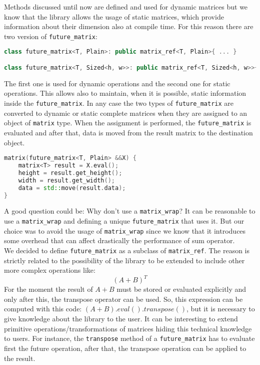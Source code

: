 \documentclass[11pt,a4paper]{article}
\begin{document}
Methods discussed until now are defined and used for dynamic matrices but we know that the library allows the usage of static matrices, which provide information about their dimension also at compile time. For this reason there are two version of \verb|future_matrix|:
\begin{lstlisting}[language=C++]
class future_matrix<T, Plain>: public matrix_ref<T, Plain>{ ... }

class future_matrix<T, Sized<h, w>>: public matrix_ref<T, Sized<h, w>>{ ... }
\end{lstlisting}
The first one is used for dynamic operations and the second one for static operations. This allows also to maintain, when it is possible, static information inside the \verb|future_matrix|. In any case the two types of \verb|future_matrix| are converted to dynamic or static complete matrices when they are assigned to an object of \verb|matrix| type. When the assignment is performed, the \verb|future_matrix| is evaluated and after that, data is moved from the result matrix to the destination object.
\begin{lstlisting}[language=C++]
matrix(future_matrix<T, Plain> &&X) {
	matrix<T> result = X.eval();
	height = result.get_height();
	width = result.get_width();
	data = std::move(result.data);
}
\end{lstlisting}

A good question could be: Why don't use a \verb|matrix_wrap|?
It can be reasonable to use a \verb|matrix_wrap| and defining a unique \verb|future_matrix| that uses it. But our choice was to avoid the usage of \verb|matrix_wrap| since we know that it introduces some overhead that can affect drastically the performance of sum operator.  \\

We decided to define \verb|future_matrix| as a subclass of \verb|matrix_ref|. The reason is strictly related to the possibility of the library to be extended to include other more complex operations like:
$$(A+B)^T$$
For the moment the result of $A+B$ must be stored or evaluated explicitly and only after this, the transpose operator can be used. So, this expression can be computed with this code: $(A+B).eval().transpose()$, but it is necessary to give knowledge about the library to the user. It can be interesting to extend primitive operations/transformations of matrices hiding this technical knowledge to users. For instance, the \verb|transpose| method of a \verb|future_matrix| has to evaluate first the future operation, after that, the transpose operation can be applied to the result.\\
\end{document}
